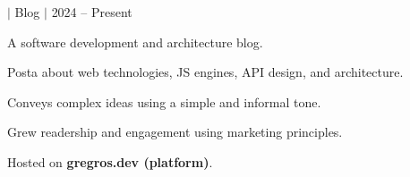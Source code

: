 \begin{project}{\textbf{\gregrosdev} $|$ Blog $|$
    \https{\mywebsite}}{2024 -- Present}
  \item A software development and architecture blog.
  \item Posta about web technologies, JS engines, API design, and architecture.
  \item Conveys complex ideas using a simple and informal tone.
  \item Grew readership and engagement using marketing principles.
  \item Hosted on \textbf{gregros.dev (platform)}.
  \end{project}